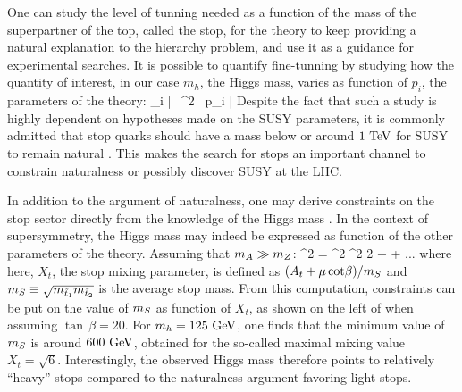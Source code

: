    One can study the level of tunning needed as a function of the mass of the superpartner
    of the top, called the stop, for the theory to keep providing a natural explanation to the hierarchy
    problem, and use it as a guidance for experimental searches. It is possible to quantify
    fine-tunning by studying how the quantity of interest, in our case $m_h$, the Higgs mass,
    varies as function of $p_i$, the parameters of the theory:
    {
        \Delta {}
        _i
        \left|
             \frac
             {\partial {}\, ^2}
             {\partial {}\, p_i}
        \right|
    }
    Despite the fact that such a study is highly dependent on hypotheses made on the SUSY parameters,
    it is commonly admitted that stop quarks should have a mass below or around $1~\text{TeV}$
    for SUSY to remain natural \cite{TheMoreMinimalSSM, NaturalSusyEndures, ANaturalSUSYHiggs,NaturalSUSYAndDarkMatter}. This makes the search for
    stops an important channel to constrain naturalness or possibly discover SUSY
    at the LHC.

    In addition to the argument of naturalness, one may derive constraints on the stop
    sector directly from the knowledge of the Higgs mass \cite{TheLightStopWindow}. In
    the context of supersymmetry, the Higgs mass may indeed be expressed as function
    of the other parameters of the theory. Assuming that $m_{A} \gg m_{Z}$:
    {
        ^2
        =
        ^2 ^2 2\beta
        +
        + ...
    }
    where here, $X_t$, the stop mixing parameter, is defined as
    $(A_t + \mu\, \text{cot} \beta) / m_{S}$ and $m_{S} \equiv
    \sqrt{m_{\tilde{t}_1}m_{\tilde{t}_2}}$ is the average stop
    mass. From this computation, constraints can be put on the value of $m_{S}$ as
    function of $X_t$, as shown on the left of  when assuming $\tan\, \beta
    = 20$. For $m_{h}= 125~\text{GeV}$, one finds that the minimum value of $m_{S}$ is
    around $600~\text{GeV}$, obtained for the so-called maximal mixing value $X_t = \sqrt{6}$.
    Interestingly, the observed Higgs mass therefore points to relatively ``heavy''
    stops compared to the naturalness argument favoring light stops.

